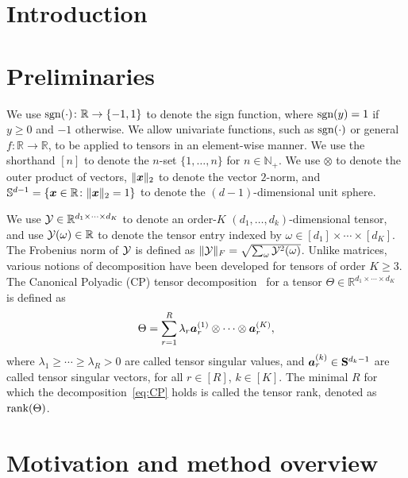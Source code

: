 \documentclass{article}
\theoremstyle{plain}
\theoremstyle{definition}
\def\sign{\textup{sgn}}
\def\rank{\textup{rank}}
\begin{document}
\section{Introduction}\label{Intro}

\section{Preliminaries}
We use $\sign(\cdot)\colon \mathbb{R}\to\{-1,1\}$ to denote the sign function, where $\sign(y)=1$ if $y\geq 0$ and $-1$ otherwise. We allow univariate functions, such as $\sign(\cdot)$ or general $f\colon \mathbb{R}\to\mathbb{R}$, to be applied to tensors in an element-wise manner. We use the shorthand $[n]$ to denote the $n$-set $\{1,\ldots,n\}$ for $n\in\mathbb{N}_{+}$. We use $\otimes$ to denote the outer product of vectors, $\lVert\bm x\rVert_2$ to denote the vector $2$-norm, and $\mathbb{S}^{d-1}=\{\bm x\in\mathbb{R}\colon \lVert\bm x\rVert_2=1\}$ to denote the $(d-1)$-dimensional unit sphere.

We use $\mathcal{Y}\in\mathbb{R}^{d_1\times \cdots \times d_K}$ to denote an order-$K$ $(d_1,\ldots,d_k)$-dimensional tensor, and use $\mathcal{Y}(\omega)\in\mathbb{R}$ to denote the tensor entry indexed by $\omega \in[d_1]\times \cdots \times [d_K]$. The Frobenius norm of $\mathcal{Y}$ is defined as $\lVert\mathcal{Y}\rVert_F=\sqrt{\sum_{\omega}\mathcal{Y}^2(\omega)}$. Unlike matrices, various notions of decomposition have been developed for tensors of order $K\geq 3$. The Canonical Polyadic (CP) tensor decomposition~\cite{hitchcock1927expression} for a tensor $\Theta\in\mathbb{R}^{d_1\times \cdots \times d_K}$ is defined as
\begin{equation}\label{eq:CP}
\Theta=\sum_{r=1}^R\lambda_r \bm{a}^{(1)}_r\otimes\cdots\otimes \bm{a}^{(K)}_r,
\end{equation}
where $\lambda_1\geq \cdots \geq \lambda_R>0$ are called tensor singular values, and $\bm{a}^{(k)}_r \in \mathbf{S}^{d_k-1}$ are called tensor singular vectors, for all $r\in[R]$, $k\in[K]$. The minimal $R$ for which the decomposition~\eqref{eq:CP} holds is called the tensor rank, denoted as $\rank(\Theta)$. 
\section{Motivation and method overview}
\end{document}
